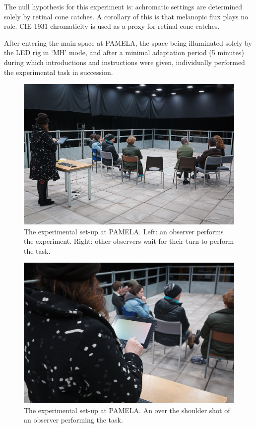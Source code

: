 The null hypothesis for this experiment is: achromatic settings are determined solely by retinal cone catches. A corollary of this is that melanopic flux plays no role. CIE 1931 chromaticity is used as a proxy for retinal cone catches.




After entering the main space at \gls{PAMELA}, the space being illuminated solely by the \gls{LED} rig in `MH' mode, and after a minimal adaptation period (5 minutes) during which introductions and instructions were given, individually performed the experimental task in succession. 

\begin{figure}[p]
\includegraphics[max width=\textwidth]{figs/tablet/PAMELAobs1.jpg} 
\caption{The experimental set-up at \acrshort{PAMELA}. Left: an observer performs the experiment. Right: other observers wait for their turn to perform the task.}
\label{fig:PAMELAobs1}
\end{figure}

\begin{figure}[p]
\includegraphics[max width=\textwidth]{figs/tablet/PAMELAobs2.jpg} 
\caption{The experimental set-up at \gls{PAMELA}. An over the shoulder shot of an observer performing the task.}
\label{fig:PAMELAobs2}
\end{figure}

